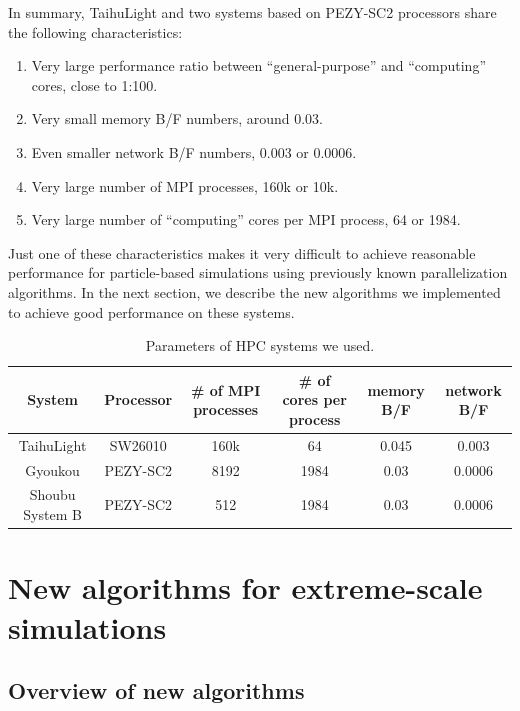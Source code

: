 \documentclass[Afour,sageh,times]{sagej}
\begin{document}
In summary, TaihuLight and two systems based on PEZY-SC2 processors
share the following characteristics:

\begin{enumerate}
\item Very large performance ratio between ``general-purpose''
  and ``computing'' cores, close to 1:100.
\item  Very small memory  B/F numbers, around 0.03.
\item  Even smaller network B/F numbers, 0.003 or 0.0006.
\item Very large number of MPI processes, 160k  or 10k.
\item Very large number of ``computing'' cores per MPI process, 64 or 1984.  
\end{enumerate}

Just one of these characteristics makes it very difficult to achieve
reasonable performance for particle-based simulations using previously
known parallelization algorithms. In the next section, we describe the
new algorithms we implemented to achieve good performance on these
systems.



\begin{table}
  \begin{tabular}{cccccc}
    \toprule
     System            & Processor & \# of MPI processes & \# of cores per process & memory B/F & network B/F \\
     \midrule
     TaihuLight        & SW26010  & 160k & 64   & 0.045  & 0.003   \\
     Gyoukou           & PEZY-SC2 & 8192 & 1984 & 0.03   & 0.0006  \\
     Shoubu System B   & PEZY-SC2 & 512  & 1984 & 0.03   & 0.0006  \\
  \bottomrule
  \end{tabular}
  \caption{Parameters of HPC systems we used.}
  \label{tab:system}
\end{table}

\section{New algorithms for extreme-scale simulations}
\label{sect:innovation}

  \subsection{Overview of new algorithms}
  
\end{document}
